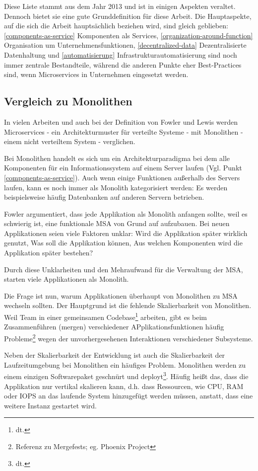 Diese Liste stammt aus dem Jahr 2013 und ist in einigen Aspekten veraltet.
Dennoch bietet sie eine gute Grunddefinition für diese Arbeit. Die Hauptaspekte,
auf die sich die Arbeit hauptsächlich beziehen wird, sind gleich geblieben:
\ref{components-as-service} Komponenten als Services,
\ref{organization-around-function} Organisation um Unternehmensfunktionen,
\ref{decentralized-data} Dezentralisierte Datenhaltung und
\ref{automatisierung} Infrastrukturautomatisierung sind noch immer zentrale Bestandteile, während die
anderen Punkte eher Best-Practices sind, wenn Microservices in Unternehmen
eingesetzt werden.

\subsection{Vergleich zu Monolithen}\label{compare-monolith}

In vielen Arbeiten und auch bei der Definition von Fowler und Lewis werden
Microservices - ein Architekturmuster für verteilte Systeme - mit Monolithen -
einem nicht verteiltem System - verglichen.

Bei Monolithen handelt es sich um ein Architekturparadigma bei dem alle
Komponenten für ein Informationssystem auf einem Server laufen (Vgl. Punkt
\ref{components-as-service}). Auch wenn einige Funktionen außerhalb des Servers
laufen, kann es noch immer als Monolith kategorisiert werden: Es werden
beispielsweise häufig Datenbanken auf anderen Servern betrieben.

Fowler argumentiert, dass jede Applikation als Monolith anfangen sollte, weil es
schwierig ist, eine funktionale MSA von Grund auf aufzubauen. Bei neuen
Applikationen seien viele Faktoren unklar: Wird die Applikation später wirklich
genutzt, Was soll die Applikation können, Aus welchen Komponenten wird die
Applikation später bestehen?

Durch diese Unklarheiten und den Mehraufwand für die Verwaltung der MSA, starten viele
Applikationen als Monolith.

Die Frage ist nun, warum Applikationen überhaupt von Monolithen zu MSA wechseln
sollten. Der Hauptgrund ist die fehlende Skalierbarkeit von Monolithen. Weil
Team in einer gemeinsamen Codebase\footnote{dt.} arbeiten, gibt es beim
Zusammenführen (mergen) verschiedener APplikationsfunktionen häufig
Probleme\footnote{Referenz zu Mergefests; eg. Phoenix Project} wegen der
unvorhergesehenen Interaktionen verschiedener Subsysteme.

Neben der Skalierbarkeit der Entwicklung ist auch die Skalierbarkeit der
Laufzeitumgebung bei Monolithen ein häufiges Problem. Monolithen werden zu einem
einzigen Softwarepaket geschnürt und deployt\footnote{dt.}. Häufig heißt das,
dass die Applikation nur vertikal skalieren kann, d.h. dass Ressourcen, wie CPU,
RAM oder IOPS an das laufende System hinzugefügt werden müssen, anstatt, dass
eine weitere Instanz gestartet wird.

